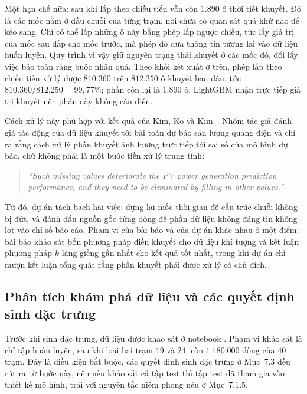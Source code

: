 Một hạn chế nữa: sau khi lấp theo chiều tiến vẫn còn $1.890$ ô thời tiết khuyết. Đó là các mốc
nằm ở đầu chuỗi của từng trạm, nơi chưa có quan sát quá khứ nào để kéo sang. Chỉ có thể lấp
những ô này bằng phép lấp ngược chiều, tức lấy giá trị của mốc sau đắp cho mốc trước, mà phép đó
đưa thông tin tương lai vào dữ liệu huấn luyện. Quy trình vì vậy giữ nguyên trạng thái khuyết
ở các mốc đó, đổi lấy việc bảo toàn ràng buộc nhân quả. Theo khối kết xuất ở trên, phép lấp
theo chiều tiến xử lý được $810.360$ trên $812.250$ ô khuyết ban đầu, tức
$810.360 / 812.250 = 99{,}77\%$; phần còn lại là $1.890$ ô. LightGBM nhận trực tiếp giá trị
khuyết nên phần này không cần điền.

Cách xử lý này phù hợp với kết quả của Kim, Ko và Kim~\cite{kim2019missing}. Nhóm tác
giả đánh giá tác động của dữ liệu khuyết tới bài toán dự báo sản lượng quang điện và
chỉ ra rằng cách xử lý phần khuyết ảnh hưởng trực tiếp tới sai số của mô hình dự báo,
chứ không phải là một bước tiền xử lý trung tính:

\begin{quote}\small
\textit{``Such missing values deteriorate the PV power generation prediction performance, and they need to be eliminated by filling in other values.''}
\end{quote}


Từ đó, dự án tách bạch hai việc: dựng lại mốc thời gian để cấu trúc chuỗi
không bị đứt, và đánh dấu nguồn gốc từng dòng để phần dữ liệu không đáng tin
không lọt vào chỉ số báo cáo. Phạm vi của bài báo và của dự án khác nhau ở một điểm: bài báo khảo
sát bốn phương pháp điền khuyết cho dữ liệu khí tượng và kết luận phương pháp
$k$ láng giềng gần nhất cho kết quả tốt nhất, trong khi dự án chỉ mượn kết luận tổng
quát rằng phần khuyết phải được xử lý có chủ đích.

\FloatBarrier
\subsection{Phân tích khám phá dữ liệu và các quyết định sinh đặc trưng}

Trước khi sinh đặc trưng, dữ liệu được khảo sát ở notebook . Phạm vi khảo sát là
chỉ tập huấn luyện, sau khi loại hai trạm $19$ và $24$: còn $1.480.000$ dòng của
$40$ trạm. Đây là điều kiện bắt buộc, các quyết định sinh đặc trưng ở Mục~$7.3$ đều rút ra
từ bước này, nên nếu khảo sát cả tập test thì tập test đã tham gia vào thiết kế mô hình,
trái với nguyên tắc niêm phong nêu ở Mục~$7.1.5$.

